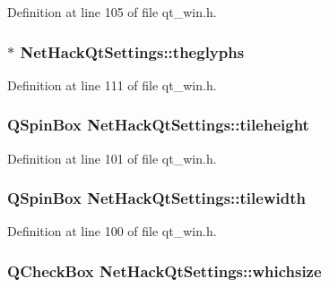 Definition at line 105 of file qt\+\_\+win.\+h.

\hypertarget{classNetHackQtSettings_a5f266d486269b67477007a4a848922a5}{
\subsubsection[{theglyphs}]{$\ast$ Net\+Hack\+Qt\+Settings\+::theglyphs\hspace{0.3cm}{\ttfamily [private]}}}\label{classNetHackQtSettings_a5f266d486269b67477007a4a848922a5}


Definition at line 111 of file qt\+\_\+win.\+h.

\hypertarget{classNetHackQtSettings_ab55954c702c1f9e3e912c9a5c763a098}{
\subsubsection[{tileheight}]{\setlength{\rightskip}{0pt plus 5cm}Q\+Spin\+Box Net\+Hack\+Qt\+Settings\+::tileheight\hspace{0.3cm}{\ttfamily [private]}}}\label{classNetHackQtSettings_ab55954c702c1f9e3e912c9a5c763a098}


Definition at line 101 of file qt\+\_\+win.\+h.

\hypertarget{classNetHackQtSettings_a0407cbea95ad807c98ca7bd9c7913400}{
\subsubsection[{tilewidth}]{\setlength{\rightskip}{0pt plus 5cm}Q\+Spin\+Box Net\+Hack\+Qt\+Settings\+::tilewidth\hspace{0.3cm}{\ttfamily [private]}}}\label{classNetHackQtSettings_a0407cbea95ad807c98ca7bd9c7913400}


Definition at line 100 of file qt\+\_\+win.\+h.

\hypertarget{classNetHackQtSettings_ac761d5961ac831001e4f68cbe2b75265}{
\subsubsection[{whichsize}]{\setlength{\rightskip}{0pt plus 5cm}Q\+Check\+Box Net\+Hack\+Qt\+Settings\+::whichsize\hspace{0.3cm}{\ttfamily [private]}}}\label{classNetHackQtSettings_ac761d5961ac831001e4f68cbe2b75265}


